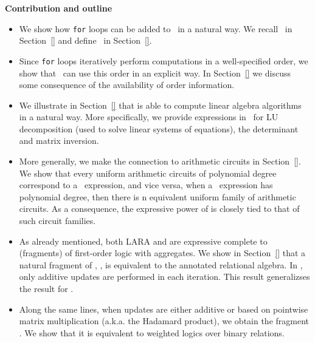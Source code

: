 \medskip
\noindent
\textbf{Contribution and outline}
\begin{itemize}[leftmargin=0.5cm]
	\item We show how \texttt{for} loops can be added to \lang\ in a natural way. We recall \lang\ in Section~\ref{} and define \langfor\ in Section~\ref{}.
	\item Since \texttt{for} loops iteratively perform computations in a well-specified order, we show that \langfor\ can use this order in an explicit way. In Section~\ref{} we discuss some consequence of the availability of order information.
	\item We illustrate in Section~\ref{} that \langfor is able to compute linear algebra algorithms in a natural way. More specifically, we provide expressions in \langfor\ for LU decomposition (used to solve linear systems of equations), the determinant and matrix inversion.
	\item More generally, we make the connection to arithmetic circuits in Section~\ref{}. We show that every  uniform arithmetic circuits of polynomial degree correspond to a \langfor\ expression, and vice versa, when a \langfor\ expression has polynomial degree, then there is n equivalent uniform family of arithmetic circuits.
	As a consequence, the expressive power of \langfor is closely tied to that of such circuit families.
	\item As already mentioned, both LARA and \lang are expressive complete to (fragments) of first-order logic with aggregates. We show in Section~\ref{} that a natural fragment of \langfor, \langsum, is equivalent to the annotated relational algebra. In \langsum, only additive updates are performed in each iteration. This result generalizses the result for \lang.
	\item Along the same lines, when updates are either additive or based on pointwise matrix multiplication (a.k.a. the Hadamard product), we obtain the fragment \langprod. We show that it is equivalent to weighted logics over binary relations.
\end{itemize}

